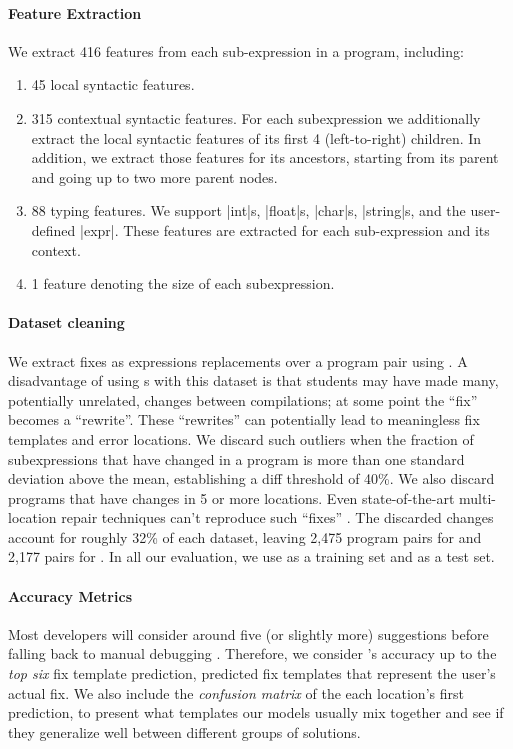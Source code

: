 \paragraph{Feature Extraction}
We extract 416 features from each sub-expression in a program, including:
%
\begin{enumerate}
  \item 45 local syntactic features.
  \item 315 contextual syntactic features. For each subexpression we
    additionally extract the local syntactic features of its first 4
    (left-to-right) children. In addition, we extract those features for its
    ancestors, starting from its parent and going up to two more parent nodes.
  \item 88 typing features. We support |int|s, |float|s, |char|s, |string|s, and
    the user-defined |expr|. These features are extracted for each
    sub-expression and its context.
  \item 1 feature denoting the size of each subexpression.
\end{enumerate}

\paragraph{Dataset cleaning}
We extract fixes as expressions replacements over a program pair using \diffsym.
A disadvantage of using \diffsym s with this dataset is that students may have
made many, potentially unrelated, changes between compilations; at some point
the ``fix'' becomes a ``rewrite''. These ``rewrites'' can potentially lead to
meaningless fix templates and error locations. We discard such outliers when the
fraction of subexpressions that have changed in a program is more than one
standard deviation above the mean, establishing a diff threshold of 40\%. We
also discard programs that have changes in 5 or more locations. Even
state-of-the-art multi-location repair techniques can't reproduce such ``fixes''
\citep{Saha_2019}. The discarded changes account for roughly 32\% of each
dataset, leaving 2,475 program pairs for \SPRING and 2,177 pairs for \FALL. In
all our evaluation, we use \SPRING as a training set and \FALL as a test set.

\paragraph{Accuracy Metrics}
Most developers will consider around five (or slightly more) suggestions before
falling back to manual debugging \citep{Kochhar2016-oc}. Therefore, we consider
\toolname's accuracy up to the \emph{top six} fix template prediction, \ie
predicted fix templates that represent the user's actual fix. We also include
the \emph{confusion matrix} of the each location's first prediction, to present
what templates our models usually mix together and see if they generalize well
between different groups of solutions.

